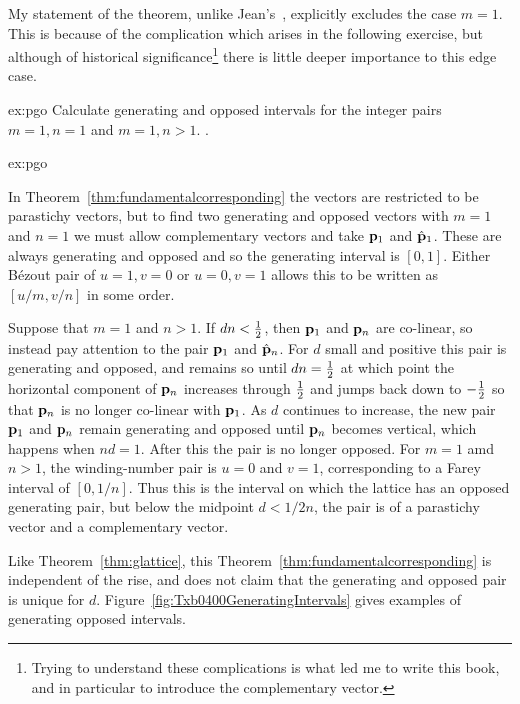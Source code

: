 My statement of the theorem, unlike Jean's~\autocite{jeanPhyllotaxisSystemicStudy1994}, explicitly excludes the case $m=1$. This is because of the complication which arises in the following exercise, but although of historical significance\footnote{Trying to understand these complications is what led me to write this book, and in particular to introduce the complementary vector.} there is little deeper importance to this edge case.

\begin{jExercise}{ex:pgo}
	Calculate generating and opposed intervals for the integer pairs $m=1,n=1$ and $m=1,n>1$.
	\label{ex:ftpfail}.
\end{jExercise}
\begin{jAnswer}{ex:pgo}
	
	In Theorem~\ref{thm:fundamentalcorresponding} the vectors are restricted to be parastichy vectors, but to find two generating and opposed vectors  with $m=1$ and $n=1$ we must allow complementary vectors and take ${\mathbf p}_{1}$ and $\hat{\mathbf p}_{1}$. 
	These are always generating and opposed and so the generating interval is $[0,1]$. 
	Either B\'ezout pair of $u=1, v=0$ or $u=0,v=1$ allows this to be written as $[u/m,v/n]$ in some order.
	
	Suppose that $m=1$ and $n>1$. If $dn<\textstyle{\frac{1}{2}}$, then ${\mathbf p}_{1}$ and ${\mathbf p}_{n}$ are co-linear, so instead pay attention to the pair ${\mathbf p}_{1}$ and $\hat{\mathbf p}_{n}$. For $d$ small and positive this pair is generating and opposed, and remains so until $dn=\textstyle{\frac{1}{2}}$ at which point the horizontal component of ${\mathbf p}_{n}$ increases through $\textstyle{\frac{1}{2}}$ and jumps back down to $-\textstyle{\frac{1}{2}}$ so that  ${\mathbf p}_{n}$ is no longer co-linear with ${\mathbf p}_{1}$. As $d$ continues to increase, the new pair ${\mathbf p}_{1}$ and ${\mathbf p}_{n}$ remain generating and opposed until
	 ${\mathbf p}_{n}$ becomes vertical, which happens when $nd=1$. After this the pair is no longer opposed.
	 	 For $m=1$ amd $n>1$, the winding-number pair is $u=0$ and $v=1$, corresponding to a Farey interval of $[0,1/n]$. Thus this is the interval on which the lattice has an opposed generating pair, but below the midpoint $d<1/2n$, the pair is of a parastichy vector and a complementary vector. 
	 

\end{jAnswer}

Like Theorem~\ref{thm:glattice}, this Theorem~\ref{thm:fundamentalcorresponding} is independent of the rise, and does not claim that the generating and opposed pair is unique for $d$. Figure~\ref{fig:Txb0400GeneratingIntervals} gives examples of generating opposed intervals. %

